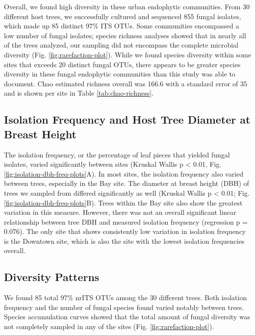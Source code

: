 \documentclass[fleqn,10pt,lineno]{wlpeerj} %
\begin{document}
Overall, we found high diversity in these urban endophytic communities. From 30 different host trees, we successfully cultured and sequenced 855 fungal isolates, which made up 85 distinct 97\% ITS OTUs. Some communities encompassed a low number of fungal isolates; species richness analyses showed that in nearly all of the trees analyzed, our sampling did not encompass the complete microbial diversity (Fig. \ref{fig:rarefaction-plot}). While we found species diversity within some sites that exceeds 20 distinct fungal OTUs, there appears to be greater species diversity in these fungal endophytic communities than this study was able to document. Chao estimated richness overall was 166.6 with a standard error of 35 and is shown per site in Table \ref{tab:chao-richness}.

\hypertarget{isolation-frequency-and-host-tree-diameter-at-breast-height}{%
\subsection*{Isolation Frequency and Host Tree Diameter at Breast Height}\label{isolation-frequency-and-host-tree-diameter-at-breast-height}}

The isolation frequency, or the percentage of leaf pieces that yielded fungal isolates, varied significantly between sites (Kruskal Wallis p \textless{} 0.01, Fig. \ref{fig:isolation-dbh-freq-plots}A). In most sites, the isolation frequency also varied between trees, especially in the Bay site. The diameter at breast height (DBH) of trees we sampled from differed significantly as well (Kruskal Wallis p \textless{} 0.01; Fig. \ref{fig:isolation-dbh-freq-plots}B). Trees within the Bay site also show the greatest variation in this measure. However, there was not an overall significant linear relationship between tree DBH and measured isolation frequency (regression p = 0.076). The only site that shows consistently low variation in isolation frequency is the Downtown site, which is also the site with the lowest isolation frequencies overall.

\hypertarget{diversity-patterns}{%
\subsection*{Diversity Patterns}\label{diversity-patterns}}

We found 85 total 97\% nrITS OTUs among the 30 different trees. Both isolation frequency and the number of fungal species found varied notably between trees. Species accumulation curves showed that the total amount of fungal diversity was not completely sampled in any of the sites (Fig. \ref{fig:rarefaction-plot}).
\end{document}

